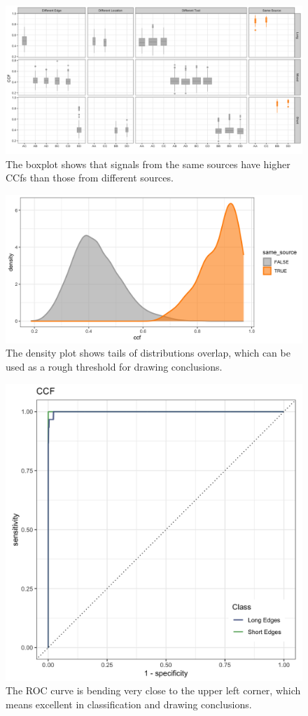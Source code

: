 \documentclass[fleqn,10pt]{wlscirep}
\begin{document}
\begin{figure}[ht]
\centering
\includegraphics[width=0.8\linewidth]{ccf_boxplot.png}
\caption{The boxplot shows that signals from the same sources have higher CCfs than those from different sources.}
\label{fig: ccf_boxplot}
\end{figure}

\begin{figure}[ht]
\centering
\includegraphics[width=0.8\linewidth]{ccf_density.png}
\caption{The density plot shows tails of distributions overlap, which can be used as a rough threshold for drawing conclusions.}
\label{fig: ccf_density}
\end{figure}

\begin{figure}[ht]
\centering
\includegraphics[width=0.5\linewidth]{ccf_ROC.png}
\caption{The ROC curve is bending very close to the upper left corner, which means excellent in classification and drawing conclusions.}
\label{fig: ccf_ROC}
\end{figure}
\end{document}
